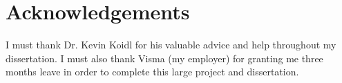 \section*{Acknowledgements}
I must thank Dr. Kevin Koidl for his valuable advice and
help throughout my dissertation.  I must also thank Visma (my
employer) for granting me three months leave in order to complete
this large project and dissertation.